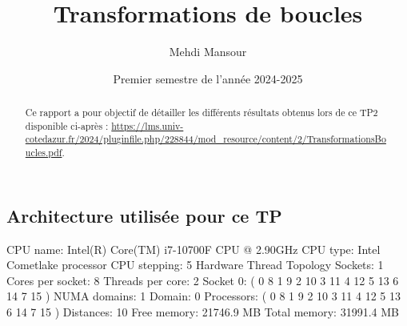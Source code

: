 \documentclass{rapport}
\title{Transformations de boucles}
\author{Mehdi Mansour}
\date{Premier semestre de l'année 2024-2025}
\begin{document}
  \maketitle

  \begin{abstract}
    Ce rapport a pour objectif de détailler les différents résultats obtenus lors de ce TP2 disponible ci-après : \url{https://lms.univ-cotedazur.fr/2024/pluginfile.php/228844/mod_resource/content/2/TransformationsBoucles.pdf}.
     \end{abstract}
\subsection*{Architecture utilisée pour ce TP}
     \noindent
    CPU name:	Intel(R) Core(TM) i7-10700F CPU @ 2.90GHz
    \newline
    CPU type:	Intel Cometlake processor
    \newline
    CPU stepping:	5
    \newline
    \newline
    \noindent
    Hardware Thread Topology
    \newline
    \newline
    Sockets:		1
    \newline
    Cores per socket:	8
    \newline
    Threads per core:	2
    \newline
    Socket 0:		( 0 8 1 9 2 10 3 11 4 12 5 13 6 14 7 15 )
    \newline
    \newline
    NUMA domains:		1
    \newline
    Domain:			0
    \newline
    Processors:		( 0 8 1 9 2 10 3 11 4 12 5 13 6 14 7 15 )
    \newline
    Distances:		10
    \newline
    Free memory:		21746.9 MB
    \newline
    Total memory:		31991.4 MB
    \newline
\end{document}
